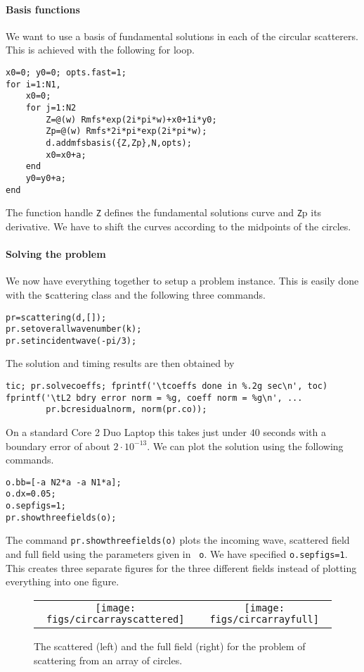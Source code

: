 \paragraph{Basis functions}

We want to use a basis of fundamental solutions in each of the
circular scatterers. This is achieved with the following for loop.
\begin{verbatim}
x0=0; y0=0; opts.fast=1;
for i=1:N1,
    x0=0;
    for j=1:N2
        Z=@(w) Rmfs*exp(2i*pi*w)+x0+1i*y0;
        Zp=@(w) Rmfs*2i*pi*exp(2i*pi*w);
        d.addmfsbasis({Z,Zp},N,opts);
        x0=x0+a;
    end
    y0=y0+a;
end
\end{verbatim}
The function handle {\texttt Z} defines the fundamental solutions
curve and {\texttt Zp} its derivative. We have to shift the curves
according to the midpoints of the circles.

\paragraph{Solving the problem}
We now have everything together to setup a problem instance.
This is easily done with the {\texttt
  scattering} class and the following three commands.

\begin{verbatim}
pr=scattering(d,[]);
pr.setoverallwavenumber(k);
pr.setincidentwave(-pi/3);
\end{verbatim}

The solution and timing results are then obtained by
\begin{verbatim}
tic; pr.solvecoeffs; fprintf('\tcoeffs done in %.2g sec\n', toc)
fprintf('\tL2 bdry error norm = %g, coeff norm = %g\n', ...
        pr.bcresidualnorm, norm(pr.co));
\end{verbatim}
On a standard Core 2 Duo Laptop this takes just under $40$
seconds with a boundary error of about $2\cdot 10^{-13}$.
We can plot the solution using the following commands.
\begin{verbatim}
o.bb=[-a N2*a -a N1*a];
o.dx=0.05;
o.sepfigs=1;
pr.showthreefields(o);
\end{verbatim}
The command {\tt pr.showthreefields(o)} plots the incoming wave,
scattered field and full field using the parameters given in {\tt
  o}. We have specified {\tt o.sepfigs=1}. This creates three
separate figures for the three different fields instead of plotting
everything into one figure.

\begin{figure}
\center
\begin{tabular}{cc}
\texttt{[image: figs/circarrayscattered]} &
\texttt{[image: figs/circarrayfull]}
\end{tabular}
\caption{The scattered (left) and the full field (right) for the
  problem of scattering from an array of circles.}
\label{fig:circarraysol}
\end{figure}


